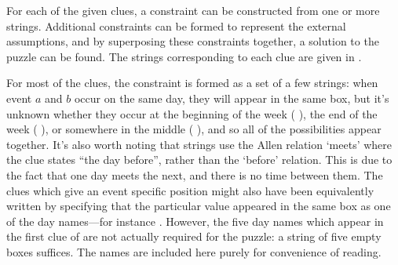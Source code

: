 \documentclass[a4paper,12pt,leqno,twoside]{article}
\newcommand{\vph}[1]{\vphantom{#1}}
\newcommand{\ebox}[1]{\fbox{$\vph{'(),}#1$}}
\newcommand{\EventString}[1]{%
	\renewcommand*{\do}[1]{\ebox{##1}}%
	\PipeParser{#1}%
}
\begin{document}
For each of the given clues, a constraint can be constructed from one or more strings. Additional constraints can be formed to represent the external assumptions, and by superposing these constraints together, a solution to the puzzle can be found. The strings corresponding to each clue are given in .

For most of the clues, the constraint is formed as a set of a few strings: when event $a$ and $b$ occur on the same day, they will appear in the same box, but it's unknown whether they occur at the beginning of the week (\EventString{a,b|{}}), the end of the week (\EventString{{}|a,b}), or somewhere in the middle (\EventString{{}|a,b|{}}), and so all of the possibilities appear together. It's also worth noting that strings use the Allen relation `meets' where the clue states ``the day before'', rather than the `before' relation. This is due to the fact that one day meets the next, and there is no time between them. The clues which give an event specific position might also have been equivalently written by specifying that the particular value appeared in the same box as one of the day names---for instance \EventString{mon,freezing}. However, the five day names which appear in the first clue of  are not actually required for the puzzle: a string of five empty boxes suffices. The names are included here purely for convenience of reading.
\end{document}
